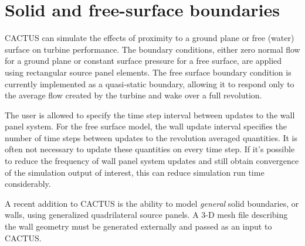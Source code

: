 \section{Solid and free-surface boundaries}
CACTUS can simulate the effects of proximity to a ground plane or free (water) surface on turbine performance. The boundary conditions, either zero normal flow for a ground plane or constant surface pressure for a free surface, are applied using rectangular source panel elements. The free surface boundary condition is currently implemented as a quasi-static boundary, allowing it to respond only to the average flow created by the turbine and wake over a full revolution. 

The user is allowed to specify the time step interval between updates to the wall panel system. For the free surface model, the wall update interval specifies the number of time steps between updates to the revolution averaged quantities. It is often not necessary to update these quantities on every time step. If it's possible to reduce the frequency of wall panel system updates and still obtain convergence of the simulation output of interest, this can reduce simulation run time considerably.

A recent addition to CACTUS is the ability to model \emph{general} solid boundaries, or walls, using generalized quadrilateral source panels. A 3-D mesh file describing the wall geometry must be generated externally and passed as an input to CACTUS.